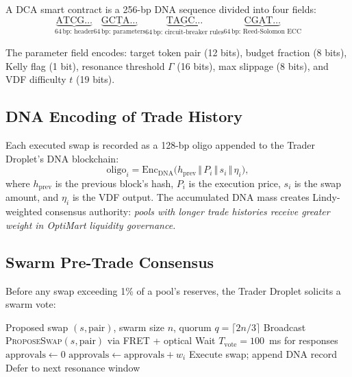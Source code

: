 \documentclass[12pt,a4paper]{article}
\begin{document}
A DCA smart contract is a 256-bp DNA sequence divided into four fields:
\begin{equation}
\underbrace{\mathrm{ATCG}\ldots}_{64\,\text{bp: header}}
\underbrace{\mathrm{GCTA}\ldots}_{64\,\text{bp: parameters}}
\underbrace{\mathrm{TAGC}\ldots}_{64\,\text{bp: circuit-breaker rules}}
\underbrace{\mathrm{CGAT}\ldots}_{64\,\text{bp: Reed-Solomon ECC}}
\label{eq:dna-contract}
\end{equation}

The parameter field encodes: target token pair (12 bits), budget fraction (8
bits), Kelly flag (1 bit), resonance threshold $\Gamma$ (16 bits), max slippage
(8 bits), and VDF difficulty $t$ (19 bits).

\subsection{DNA Encoding of Trade History}

Each executed swap is recorded as a 128-bp oligo appended to the Trader
Droplet's DNA blockchain:
\begin{equation}
\mathrm{oligo}_i = \mathrm{Enc}_{\mathrm{DNA}}\!\Big(h_\mathrm{prev} \,\Vert\, P_i \,\Vert\, s_i \,\Vert\, \eta_i\Big),
\end{equation}
where $h_\mathrm{prev}$ is the previous block's hash, $P_i$ is the execution
price, $s_i$ is the swap amount, and $\eta_i$ is the VDF output.  The
accumulated DNA mass creates Lindy-weighted consensus authority:
\emph{pools with longer trade histories receive greater weight in OptiMart
liquidity governance.}

\subsection{Swarm Pre-Trade Consensus}

Before any swap exceeding 1\% of a pool's reserves, the Trader Droplet
solicits a swarm vote:

\begin{algorithm}[ht]
\caption{Swarm pre-trade approval protocol}
\label{alg:swarm-vote}
\begin{algorithmic}[1]
\Require Proposed swap $(s, \mathrm{pair})$, swarm size $n$, quorum $q = \lceil 2n/3 \rceil$
\State Broadcast \textsc{ProposeSwap}$(s, \mathrm{pair})$ via FRET + optical
\State Wait $T_\mathrm{vote} = 100$~ms for responses
\State $\mathrm{approvals} \leftarrow 0$
        \State $\mathrm{approvals} \leftarrow \mathrm{approvals} + w_i$ 
    \EndIf
\EndFor
{}
    \State Execute swap; append DNA record
\Else
    \State Defer to next resonance window
\EndIf
\end{algorithmic}
\end{algorithm}
\end{document}
